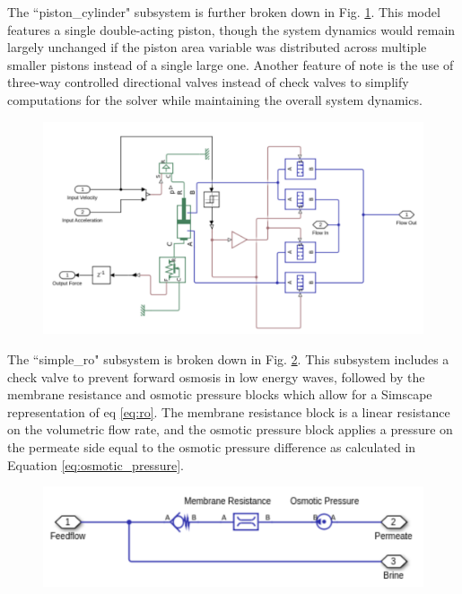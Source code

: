 \documentclass[twocolumn,10pt]{asme2e}
\begin{document}
The ``piston\_cylinder" subsystem is further broken down in Fig. \ref{fig:piston_simscape}. This model features a single double-acting piston, though the system dynamics would remain largely unchanged if the piston area variable was distributed across multiple smaller pistons instead of a single large one. Another feature of note is the use of three-way controlled directional valves instead of check valves to simplify computations for the solver while maintaining the overall system dynamics.

\begin{figure}
    \includegraphics[width=\linewidth]{../figs/pistonsimscape.pdf}
    \label{fig:piston_simscape}
\end{figure}

The ``simple\_ro" subsystem is broken down in Fig. \ref{fig:ro_simscape}. This subsystem includes a check valve to prevent forward osmosis in low energy waves, followed by the membrane resistance and osmotic pressure blocks which allow for a Simscape representation of eq \ref{eq:ro}. The membrane resistance block is a linear resistance on the volumetric flow rate, and the osmotic pressure block applies a pressure on the permeate side equal to the osmotic pressure difference as calculated in Equation \ref{eq:osmotic_pressure}.

\begin{figure}
    \centering
    \includegraphics[width=0.8\linewidth]{../figs/desalsimscape.pdf}
    \label{fig:ro_simscape}
\end{figure}
\end{document}
